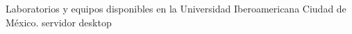 Laboratorios y equipos disponibles en la Universidad Iberoamericana Ciudad de México.
servidor
desktop